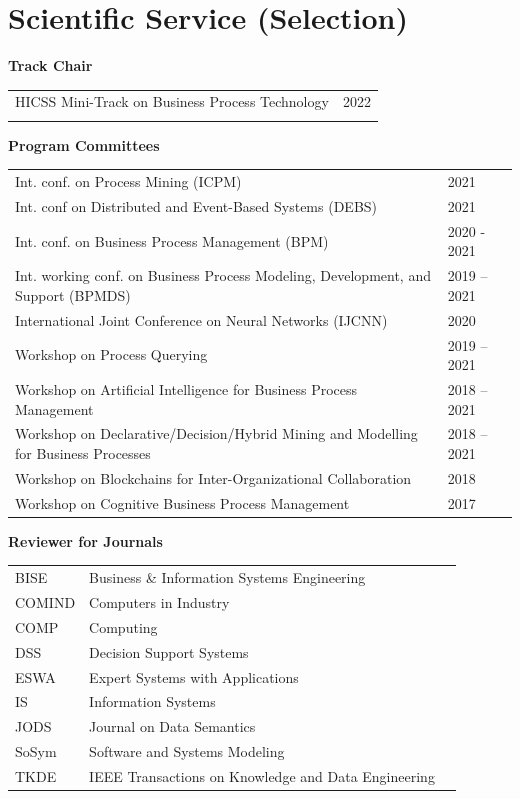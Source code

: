 \medskip
\section[Scientific Service]{Scientific Service (Selection)}


\textbf{Track Chair} 
\smallskip 

\begin{tabular}{p{13.5cm}l}
	HICSS Mini-Track on Business Process Technology & \hphantom{2020 - }2022 \\
		\noalign{\smallskip\smallskip}
\end{tabular}

\textbf{Program Committees}

\begin{tabular}{p{13.5cm}l}
	
		Int. conf. on Process Mining (ICPM) & \hphantom{2020 - }2021 \\
			Int. conf on Distributed and Event-Based Systems (DEBS) & \hphantom{2020 - }2021  \\
	Int. conf. on Business Process Management (BPM) & 2020 - 2021 \\
Int. working conf. on Business Process Modeling, Development, and Support (BPMDS) & 2019 -- 2021 \\
		International Joint Conference on Neural Networks (IJCNN) & \hphantom{2020 - }2020 \\
		
	\noalign{\smallskip\smallskip}
Workshop on Process Querying & 2019 -- 2021\\

		Workshop on Artificial Intelligence for Business Process Management  & 2018 -- 2021\\
Workshop on Declarative/Decision/Hybrid Mining and Modelling for Business Processes & 2018 -- 2021\\
Workshop on Blockchains for Inter-Organizational Collaboration & \hphantom{2020 - }2018\\
Workshop on Cognitive Business Process Management & \hphantom{2020 - }2017 \\
\end{tabular}

\newpage 
\textbf{Reviewer for Journals}
\smallskip 

\begin{tabular}{p{1.7cm}p{10.5cm}l}
	 	BISE & Business \& Information Systems Engineering \\
	 	COMIND & Computers in Industry \\
	 	COMP & Computing \\ 
 	 	DSS &  	Decision Support Systems \\
 	 	ESWA & Expert Systems with Applications \\ 
	 	IS & Information Systems \\
	 	JODS & Journal on Data Semantics \\
	 	SoSym & Software and Systems Modeling \\
	 	TKDE & IEEE Transactions on Knowledge and Data Engineering \\
\end{tabular}

